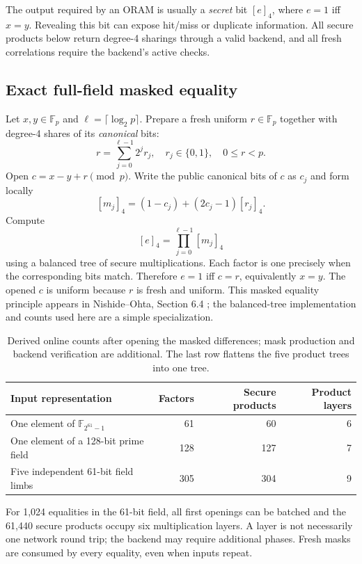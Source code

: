 \documentclass[11pt]{article}
\newcommand{\F}{\mathbb F}
\newcommand{\sh}[1]{\left[#1\right]_4}
\begin{document}
The output required by an ORAM is usually a \emph{secret} bit
$\sh e$, where $e=1$ iff $x=y$. Revealing this bit can expose hit/miss or duplicate
information. All secure products below return degree-4 sharings through a valid
backend, and all fresh correlations require the backend's active checks.

\subsection{Exact full-field masked equality}

Let $x,y\in\F_p$ and $\ell=\lceil\log_2p\rceil$. Prepare a fresh uniform
$r\in\F_p$ together with degree-4 shares of its \emph{canonical} bits:
\[
r=\sum_{j=0}^{\ell-1}2^jr_j,\quad r_j\in\{0,1\},\quad0\leq r<p.
\]
Open $c=x-y+r\pmod p$. Write the public canonical bits of $c$ as $c_j$ and form
locally
\begin{equation}
\sh{m_j}=(1-c_j)+(2c_j-1)\sh{r_j}.
\label{eq:match}
\end{equation}
Compute
\begin{equation}
\sh e=\prod_{j=0}^{\ell-1}\sh{m_j}
\label{eq:eqtree}
\end{equation}
using a balanced tree of secure multiplications. Each factor is one precisely
when the corresponding bits match. Therefore $e=1$ iff $c=r$, equivalently
$x=y$. The opened $c$ is uniform because $r$ is fresh and uniform. This masked
equality principle appears in Nishide--Ohta, Section 6.4 \cite{nishide2007}; the
balanced-tree implementation and counts used here are a simple specialization.

\begin{table}[htbp]
\centering
\begin{tabular}{@{}lrrr@{}}
\toprule
Input representation & Factors & Secure products & Product layers \\
\midrule
One element of $\F_{2^{61}-1}$ & 61 & 60 & 6 \\
One element of a 128-bit prime field & 128 & 127 & 7 \\
Five independent 61-bit field limbs & 305 & 304 & 9 \\
\bottomrule
\end{tabular}
\caption{Derived online counts after opening the masked differences; mask
production and backend verification are additional. The last row flattens the
five product trees into one tree.}
\end{table}

For 1,024 equalities in the 61-bit field, all first openings can be batched and
the 61,440 secure products occupy six multiplication layers. A layer is not
necessarily one network round trip; the backend may require additional phases.
Fresh masks are consumed by every equality, even when inputs repeat.
\end{document}
